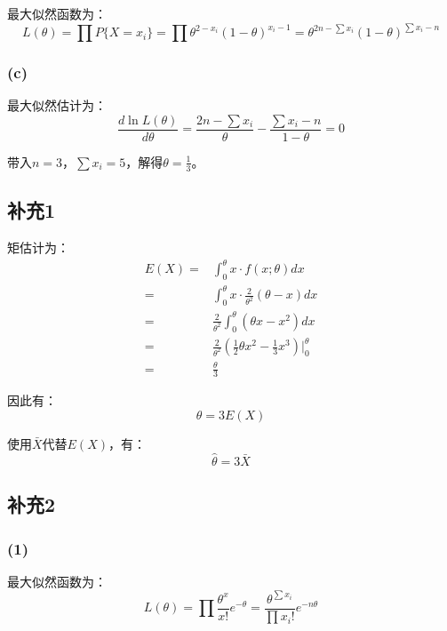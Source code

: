 \documentclass[a4paper,12pt]{ctexart}
\begin{document}
最大似然函数为：
\begin{equation*}
	L(\theta) = \prod P\{X = x_i\} = \prod \theta^{2-x_i} (1 - \theta)^{x_i-1} = \theta^{2n - \sum x_i} (1 - \theta)^{\sum x_i - n}
\end{equation*}

\subsubsection*{(c)}

最大似然估计为：
\begin{equation*}
	\frac{d \ln L(\theta)}{d \theta} = \frac{2n - \sum x_i}{\theta} - \frac{\sum x_i - n}{1 - \theta} = 0
\end{equation*}

带入$n=3$，$\sum x_i = 5$，解得$\theta = \frac{1}{3}$。
\subsection*{补充1}

矩估计为：
\begin{align*}
	E(X) =& \int_{0}^{\theta} x \cdot f(x ; \theta) dx \\
	=& \int_{0}^{\theta} x \cdot \frac{2}{\theta^2} (\theta - x) dx \\
	=& \frac{2}{\theta^2} \int_{0}^{\theta} (\theta x - x^2) dx \\
	=& \frac{2}{\theta^2} \left( \frac{1}{2} \theta x^2 - \frac{1}{3} x^3 \right) \bigg|_{0}^{\theta} \\
	=& \frac{\theta}{3}
\end{align*}

因此有：
\begin{equation*}
	\theta = 3 E(X)
\end{equation*}

使用$\bar{X}$代替$E(X)$，有：
\begin{equation*}
	\hat{\theta} = 3 \bar{X}
\end{equation*}

\subsection*{补充2}

\subsubsection*{(1)}

最大似然函数为：
\begin{equation*}
	L(\theta) = \prod \frac{\theta^x}{x!} e^{-\theta} = \frac{\theta^{\sum x_i}}{\prod x_i!} e^{-n \theta}
\end{equation*}
\end{document}
